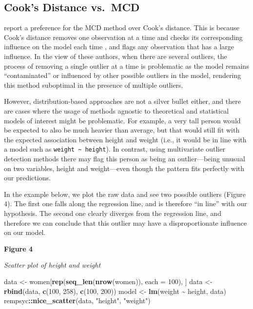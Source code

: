 \documentclass[sn-basic, lineno,pdflatex]{sn-jnl}
\newenvironment{Shaded}{\begin{snugshade}}{\end{snugshade}}
\newcommand{\AttributeTok}[1]{\textcolor[rgb]{0.13,0.29,0.53}{#1}}
\newcommand{\DecValTok}[1]{\textcolor[rgb]{0.00,0.00,0.81}{#1}}
\newcommand{\FunctionTok}[1]{\textcolor[rgb]{0.13,0.29,0.53}{\textbf{#1}}}
\newcommand{\NormalTok}[1]{#1}
\newcommand{\OtherTok}[1]{\textcolor[rgb]{0.56,0.35,0.01}{#1}}
\newcommand{\SpecialCharTok}[1]{\textcolor[rgb]{0.81,0.36,0.00}{\textbf{#1}}}
\newcommand{\StringTok}[1]{\textcolor[rgb]{0.31,0.60,0.02}{#1}}
\begin{document}
\subsection{Cook's Distance vs.~MCD}\label{cooks-distance-vs.-mcd}

\citet{leys2018outliers} report a preference for the MCD method over
Cook's distance. This is because Cook's distance removes one observation
at a time and checks its corresponding influence on the model each time
\citep{cook1977detection}, and flags any observation that has a large
influence. In the view of these authors, when there are several
outliers, the process of removing a single outlier at a time is
problematic as the model remains ``contaminated'' or influenced by other
possible outliers in the model, rendering this method suboptimal in the
presence of multiple outliers.

However, distribution-based approaches are not a silver bullet either,
and there are cases where the usage of methods agnostic to theoretical
and statistical models of interest might be problematic. For example, a
very tall person would be expected to also be much heavier than average,
but that would still fit with the expected association between height
and weight (i.e., it would be in line with a model such as
\texttt{weight\ \textasciitilde{}\ height}). In contrast, using
multivariate outlier detection methods there may flag this person as
being an outlier---being unusual on two variables, height and
weight---even though the pattern fits perfectly with our predictions.

In the example below, we plot the raw data \citep[using the
\emph{\{rempsyc\}} package,][]{theriault2023rempsyc} and see two
possible outliers (Figure 4). The first one falls along the regression
line, and is therefore ``in line'' with our hypothesis. The second one
clearly diverges from the regression line, and therefore we can conclude
that this outlier may have a disproportionate influence on our model.

\textbf{Figure 4}

\emph{Scatter plot of height and weight}

\begin{Shaded}
\begin{Highlighting}[]
\NormalTok{data }\OtherTok{\textless{}{-}}\NormalTok{ women[}\FunctionTok{rep}\NormalTok{(}\FunctionTok{seq\_len}\NormalTok{(}\FunctionTok{nrow}\NormalTok{(women)), }\AttributeTok{each =} \DecValTok{100}\NormalTok{), ]}
\NormalTok{data }\OtherTok{\textless{}{-}} \FunctionTok{rbind}\NormalTok{(data, }\FunctionTok{c}\NormalTok{(}\DecValTok{100}\NormalTok{, }\DecValTok{258}\NormalTok{), }\FunctionTok{c}\NormalTok{(}\DecValTok{100}\NormalTok{, }\DecValTok{200}\NormalTok{))}
\NormalTok{model }\OtherTok{\textless{}{-}} \FunctionTok{lm}\NormalTok{(weight }\SpecialCharTok{\textasciitilde{}}\NormalTok{ height, data)}
\NormalTok{rempsyc}\SpecialCharTok{::}\FunctionTok{nice\_scatter}\NormalTok{(data, }\StringTok{"height"}\NormalTok{, }\StringTok{"weight"}\NormalTok{)}
\end{Highlighting}
\end{Shaded}
\end{document}
